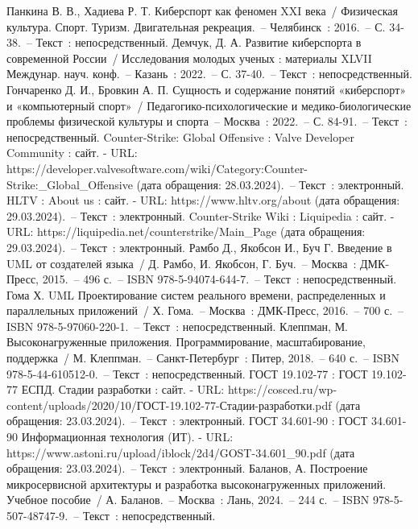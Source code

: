 \newsection
{}

\begin{thebibliography}{9}
	 Панкина В. В., Хадиева Р. Т. Киберспорт как феномен XXI века~/ Физическая культура. Спорт. Туризм. Двигательная рекреация.~– Челябинск~: 2016.~– С. 34-38.~– Текст~: непосредственный.
	 Демчук, Д. А. Развитие киберспорта в современной России~/ Исследования молодых ученых : материалы XLVII Междунар. науч. конф.~– Казань~: 2022.~– С. 37-40.~– Текст~: непосредственный.
	 Гончаренко Д. И., Бровкин А. П. Сущность и содержание понятий «киберспорт» и «компьютерный спорт»~/ Педагогико-психологические и медико-биологические проблемы физической культуры и спорта~– Москва~: 2022.~– С. 84-91.~– Текст~: непосредственный.
	 Counter-Strike: Global Offensive : Valve Developer Community : сайт. - URL: https://developer.valvesoftware.com/wiki/Category:Counter-Strike:\_Global\_Offensive (дата обращения: 28.03.2024).~– Текст~: электронный.
	 HLTV : About us : сайт. - URL: https://www.hltv.org/about (дата обращения: 29.03.2024).~– Текст~: электронный.
	 Counter-Strike Wiki : Liquipedia : сайт. - URL: https://liquipedia.net/counterstrike/Main\_Page (дата обращения: 29.03.2024).~– Текст~: электронный.
	 Рамбо Д., Якобсон И., Буч Г. Введение в UML от создателей языка~/ Д. Рамбо, И. Якобсон, Г. Буч.~– Москва~: ДМК-Пресс, 2015.~– 496 с.~– ISBN 978-5-94074-644-7.~– Текст~: непосредственный.
	 Гома Х. UML Проектирование систем реального времени, распределенных и параллельных приложений~/ Х. Гома.~– Москва~: ДМК-Пресс, 2016.~– 700 с.~– ISBN 978-5-97060-220-1.~– Текст~: непосредственный.
	 Клеппман, М. Высоконагруженные приложения. Программирование, масштабирование, поддержка~/ М. Клеппман.~– Санкт-Петербург~: Питер, 2018.~– 640 с.~– ISBN 978-5-44-610512-0.~– Текст~: непосредственный.
	 ГОСТ 19.102-77 : ГОСТ 19.102-77 ЕСПД. Стадии разработки : сайт. - URL: https://cosced.ru/wp-content/uploads/2020/10/ГОСТ-19.102-77-Стадии-разработки.pdf (дата обращения: 23.03.2024).~– Текст~: электронный.
	 ГОСТ 34.601-90 : ГОСТ 34.601-90 Информационная технология (ИТ). - URL: https://www.astoni.ru/upload/iblock/2d4/GOST-34.601\_90.pdf (дата обращения: 23.03.2024).~– Текст~: электронный.
	 Баланов, А. Построение микросервисной архитектуры и разработка высоконагруженных приложений. Учебное пособие~/ А. Баланов.~– Москва~: Лань, 2024.~– 244 с.~– ISBN 978-5-507-48747-9.~– Текст~: непосредственный.

\end{thebibliography}
